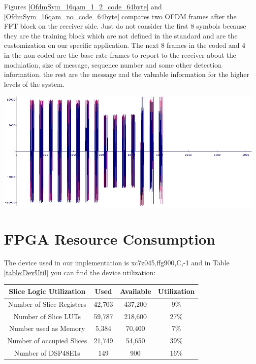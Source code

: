 Figures \ref{OfdmSym_16qam_1_2_code_64byte} and \ref{OfdmSym_16qam_no_code_64byte} compares two OFDM frames after the FFT block on the receiver side. Just do not consider the first 8 symbols because they are the training block which are not defined in the standard and are the customization on our specific application. The next 8 frames in the coded and 4 in the non-coded are the base rate frames to report to the receiver about the modulation, size of message, sequence number and some other detection information. the rest are the message and the valuable information for the higher levels of the system.\\

\begin{center}
\includegraphics[width=\textwidth]{content/fig/OfdmSym_16qam_no_code_64byte.JPG}
\label{OfdmSym_16qam_no_code_64byte}
\end{center}


\section{FPGA Resource Consumption}
The device used in our implementation is  xc7z045,ffg900,C,-1 and in Table \ref{table:DevUtil} you can find the device utilization:\\


\begin{center}
\label{table:DevUtil}
\vspace{0.5cm}
\begin{tabular}{c|c|c|c}
Slice Logic Utilization&Used&Available&Utilization\\ \hline
Number of Slice Registers&42,703&437,200&9\% \\
Number of Slice LUTs&59,787&218,600&27\% \\
Number used as Memory&5,384&70,400&7\% \\
Number of occupied Slices&21,749&54,650&39\% \\
Number of DSP48E1s&149&900&16\% \\
\end{tabular}
\end{center}

